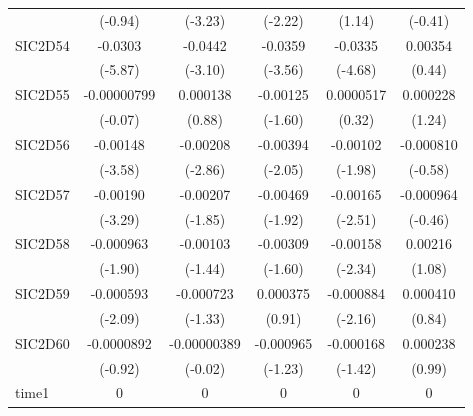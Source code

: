 \begin{table}[htbp]
\begin{tabular}{l*{5}{c}}
            &     (-0.94)         &     (-3.23)         &     (-2.22)         &      (1.14)         &     (-0.41)         \\
SIC2D54     &     -0.0303\sym{***}&     -0.0442\sym{**} &     -0.0359\sym{***}&     -0.0335\sym{***}&     0.00354         \\
            &     (-5.87)         &     (-3.10)         &     (-3.56)         &     (-4.68)         &      (0.44)         \\
SIC2D55     & -0.00000799         &    0.000138         &    -0.00125         &   0.0000517         &    0.000228         \\
            &     (-0.07)         &      (0.88)         &     (-1.60)         &      (0.32)         &      (1.24)         \\
SIC2D56     &    -0.00148\sym{***}&    -0.00208\sym{**} &    -0.00394\sym{*}  &    -0.00102\sym{*}  &   -0.000810         \\
            &     (-3.58)         &     (-2.86)         &     (-2.05)         &     (-1.98)         &     (-0.58)         \\
SIC2D57     &    -0.00190\sym{***}&    -0.00207         &    -0.00469         &    -0.00165\sym{*}  &   -0.000964         \\
            &     (-3.29)         &     (-1.85)         &     (-1.92)         &     (-2.51)         &     (-0.46)         \\
SIC2D58     &   -0.000963         &    -0.00103         &    -0.00309         &    -0.00158\sym{*}  &     0.00216         \\
            &     (-1.90)         &     (-1.44)         &     (-1.60)         &     (-2.34)         &      (1.08)         \\
SIC2D59     &   -0.000593\sym{*}  &   -0.000723         &    0.000375         &   -0.000884\sym{*}  &    0.000410         \\
            &     (-2.09)         &     (-1.33)         &      (0.91)         &     (-2.16)         &      (0.84)         \\
SIC2D60     &  -0.0000892         & -0.00000389         &   -0.000965         &   -0.000168         &    0.000238         \\
            &     (-0.92)         &     (-0.02)         &     (-1.23)         &     (-1.42)         &      (0.99)         \\
time1       &           0         &           0         &           0         &           0         &           0         \\

\end{tabular}
\end{table}
